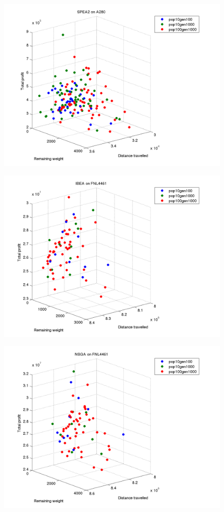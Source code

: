 \documentclass[a4paper,12pt]{article}
\begin{document}
\begin{figure}[h]
  \centering
  \includegraphics[width=.8\linewidth]{q5graphs/a280_spea.png}
  \label{fig:a280279010}
\end{figure}

\begin{figure}[h]
  \centering
  \includegraphics[width=.8\linewidth]{q5graphs/fnl4461_ibea.png}
  \label{fig:a280279010}
\end{figure}

\begin{figure}[h]
  \centering
  \includegraphics[width=.8\linewidth]{q5graphs/fnl4461_nsga.png}
  \label{fig:a280279010}
\end{figure}
\end{document}
